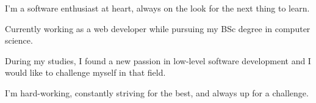 

\begin{cvparagraph}

I'm a software enthusiast at heart, always on the look for the next thing to learn. 

Currently working as a web developer while pursuing my BSc degree in computer science.

During my studies, I found a new passion in low-level software development and I would like to challenge myself in that field.

I'm hard-working, constantly striving for the best, and always up for a challenge.


\end{cvparagraph}